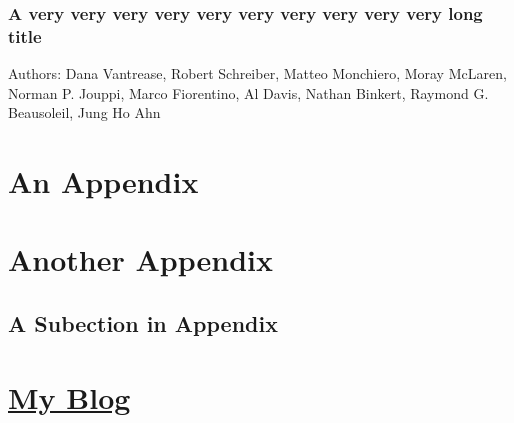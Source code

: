 \documentclass[11pt]{article}
\newcommand\myBlogUrl{http://schenax.student.ust.hk}
\begin{document}
\blindtext

\subsubsection{A very very very very very very very very very very long title \texorpdfstring{\hyperref[tab:literature]{\footnotesize \hfill\faArrowCircleOUp}}{}}
\label{lit:labelOfYourSubsubsection5}		%
{
	\tiny
	Authors: Dana Vantrease, Robert Schreiber, Matteo Monchiero, Moray McLaren, Norman P. Jouppi, Marco Fiorentino, Al Davis, Nathan Binkert, Raymond G. Beausoleil, Jung Ho Ahn \cite{Something}
	\par  %
}

\blindtext


\newpage
\begin{appendices}
	\section{An Appendix}

	


	\section{Another Appendix}
	
	\subsection{A Subection in Appendix}
	
	\section{\href{\myBlogUrl}{\noindent My Blog \texorpdfstring{\small \faExternalLink}{}}}
	
\end{appendices}
\end{document}
